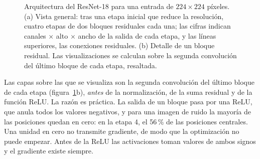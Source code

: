 \documentclass[11pt,a4paper]{article}
\begin{document}
\begin{figure}[!htb]
\caption{Arquitectura del ResNet-18 para una entrada de $224 \times 224$
píxeles. (a) Vista general: tras una etapa inicial que reduce la resolución,
cuatro etapas de dos bloques residuales cada una; las cifras indican canales
$\times$ alto $\times$ ancho de la salida de cada etapa, y las líneas
superiores, las conexiones residuales. (b) Detalle de un bloque residual. Las
visualizaciones se calculan sobre la segunda convolución del último bloque
de cada etapa, resaltada.}
\label{fig:resnet}
\end{figure}

Las capas sobre las que se visualiza son la segunda convolución del
último bloque de cada etapa (figura~\ref{fig:resnet}b), \emph{antes} de la
normalización, de la suma residual y de la función ReLU. La razón es
práctica. La salida de un bloque pasa por una ReLU, que anula todos los
valores negativos, y para una imagen de ruido la mayoría de las posiciones
quedan en cero: en la etapa 4, el 56\,\% de las posiciones centrales. Una
unidad en cero no transmite gradiente, de modo que la optimización no
puede empezar. Antes de la ReLU las activaciones toman valores de ambos
signos y el gradiente existe siempre.
\end{document}
